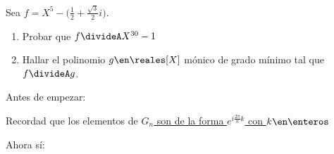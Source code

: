 \begin{enunciado}{\ejExtra}
  Sea $f = X^5 - \big(\frac{1}{2} + \frac{\sqrt{3}}{2}i \big)$.
  \begin{enumerate}[label=\alph*)]
    \item Probar que $ f \divideA X^{30} - 1$
    \item Hallar el polinomio $g \en \reales[X]$ mónico de grado mínimo tal que $f \divideA g$.
  \end{enumerate}
\end{enunciado}

Antes de empezar:
\begin{center}
  Recordad que los elementos de \underline{$G_n$ son de la forma $ e^{i\frac{2\pi}{n}k}$ con $k \en \enteros$}
\end{center}

Ahora sí:
